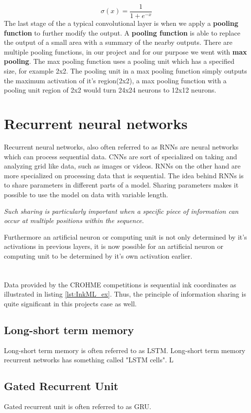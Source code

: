 \begin{equation}\label{eqn:sigmoid}
    \sigma(x) = \frac{1}{1+e^{-x}}
\end{equation}
The last stage of the a typical convolutional layer is when we apply a \textbf{pooling function}\parencite{zhou_computation_1988} to further modify the output. A \textbf{pooling function} is able to replace the output of a small area with a summary of the nearby outputs. There are multiple pooling functions, in our project and for our purpose we went with \textbf{max pooling}. The max pooling function uses a pooling unit which has a specified size, for example 2x2. The pooling unit in a max pooling function simply outputs the maximum activation of it's region(2x2), a max pooling function with a pooling unit region of 2x2 would turn 24x24 neurons to 12x12 neurons. \parencite{goodfellow_deep_2016} \parencite{nielsen_neural_2015}

\section{Recurrent neural networks}
Recurrent neural networks, also often referred to as RNNs \parencite{rumelhart_learning_1986} are neural networks which can process sequential data. CNNs are sort of specialized on taking and analyzing grid like data, such as images or videos. RNNs on the other hand are more specialized on processing data that is sequential. The idea behind RNNs is to share parameters in different parts of a model. Sharing parameters makes it possible to use the model on data with variable length. \begin{displayquote}
 \textit{Such sharing is particularly important when a specific piece of information can occur at multiple positions within the sequence.}
\end{displayquote}
Furthermore an artificial neuron or computing unit is not only determined by it's activations in previous layers, it is now possible for an artificial neuron or computing unit to be determined by it's own activation earlier. \\ \parencite{goodfellow_deep_2016} \parencite{nielsen_neural_2015} \\\\
Data provided by the CROHME competitions is sequential ink coordinates as illustrated in listing \ref{lst:InkML_ex}. Thus, the principle of information sharing is quite significant in this projects case as well. %

\subsection{Long-short term memory}
Long-short term memory is often referred to as LSTM. Long-short term memory recurrent networks has something called "LSTM cells". L

\subsection{Gated Recurrent Unit}
Gated recurrent unit is often referred to as GRU.